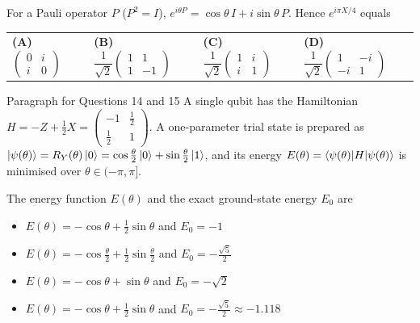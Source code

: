 \documentclass[11pt,a4paper]{article}
\newcommand{\optlabel}[1]{\textbf{(#1)}}
\newenvironment{qitem}[1]{\begin{list}{}{\setlength{\leftmargin}{3.3em}\setlength{\labelwidth}{3.1em}%
  \setlength{\labelsep}{0.2em}\setlength{\topsep}{3pt}\setlength{\parsep}{3pt}}\item[\textbf{Q.#1}\hfill]}{\end{list}}
\newcommand{\qsep}{\par\vspace{2pt}{\color{black!15}\hrule}\vspace{4pt}}
\begin{document}
\begin{qitem}{13}
For a Pauli operator $P$ ($P^2 = I$), $e^{i\theta P} = \cos\theta\,I + i\sin\theta\,P$. Hence $e^{i\pi X/4}$ equals
\par\smallskip\noindent\begin{tabularx}{\linewidth}{@{}*{4}{L}@{}}
\optlabel{A}\,$\begin{pmatrix}0 & i\\ i & 0\end{pmatrix}$ & \optlabel{B}\,$\dfrac{1}{\sqrt2}\begin{pmatrix}1 & 1\\ 1 & -1\end{pmatrix}$ & \optlabel{C}\,$\dfrac{1}{\sqrt2}\begin{pmatrix}1 & i\\ i & 1\end{pmatrix}$ & \optlabel{D}\,$\dfrac{1}{\sqrt2}\begin{pmatrix}1 & -i\\ -i & 1\end{pmatrix}$
\end{tabularx}
\end{qitem}
\qsep

\begin{passagebox}{Paragraph for Questions 14 and 15}
A single qubit has the Hamiltonian $H = -Z + \tfrac12 X = \begin{pmatrix}-1 & \tfrac12\\ \tfrac12 & 1\end{pmatrix}$.
A one-parameter trial state is prepared as $\ket{\psi(\theta)} = R_Y(\theta)\ket0 = \cos\tfrac\theta2\ket0 + \sin\tfrac\theta2\ket1$, and its
energy $E(\theta) = \braket{\psi(\theta)|H|\psi(\theta)}$ is minimised over $\theta \in (-\pi, \pi]$.
\end{passagebox}
\begin{qitem}{14}
The energy function $E(\theta)$ and the exact ground-state energy $E_0$ are
\begin{itemize}[leftmargin=2.6em, labelsep=0.4em, itemsep=2pt, topsep=3pt]
\item[\optlabel{A}] $E(\theta) = -\cos\theta + \tfrac12\sin\theta$ and $E_0 = -1$
\item[\optlabel{B}] $E(\theta) = -\cos\tfrac\theta2 + \tfrac12\sin\tfrac\theta2$ and $E_0 = -\tfrac{\sqrt5}{2}$
\item[\optlabel{C}] $E(\theta) = -\cos\theta + \sin\theta$ and $E_0 = -\sqrt2$
\item[\optlabel{D}] $E(\theta) = -\cos\theta + \tfrac12\sin\theta$ and $E_0 = -\tfrac{\sqrt5}{2} \approx -1.118$
\end{itemize}
\end{qitem}
\qsep
\end{document}

